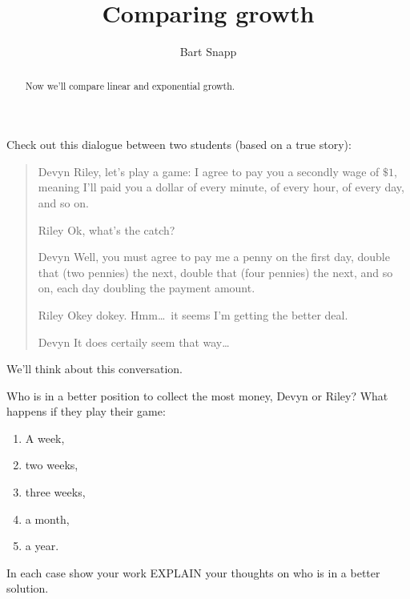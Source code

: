 \documentclass[nooutcomes,noauthor,hints]{ximera}
\title{Comparing growth}
\author{Bart Snapp}
\begin{document}
\begin{abstract}
  Now we'll compare linear and exponential growth.
\end{abstract}
\maketitle

\begin{listOutcomes}
\item 
\end{listOutcomes}
Check out this dialogue between two students (based on a true story):

\begin{mdframed}[style=OutcomeStyle]
  \begin{quote}
\begin{dialogue}
\item[Devyn] Riley, let's play a game: I agree to pay you a secondly
  wage of $\$1$, meaning I'll paid you a dollar  of
  every minute, of every hour, of every day, and so on.
\item[Riley] Ok, what's the catch? 
\item[Devyn] Well, you must agree to pay me a penny on the first day,
  double that (two pennies) the next, double that (four pennies) the
  next, and so on, each day doubling the payment amount.
\item[Riley] Okey dokey. Hmm\dots\ it seems I'm getting the better deal. 
\item[Devyn] It does certaily seem that way\dots
\end{dialogue}
  \end{quote}
\end{mdframed}
We'll think about this conversation.




\mynewpage


\begin{question}
 Who is in a better position to collect the most money, Devyn or
 Riley? What happens if they play their game:
 \begin{enumerate}
 \item A week,
 \item two weeks,
 \item three weeks,
 \item a month,
 \item a year.
 \end{enumerate}
 In each case show your work EXPLAIN your thoughts on who is in a
 better solution.
 \end{question}
 
\end{document}
